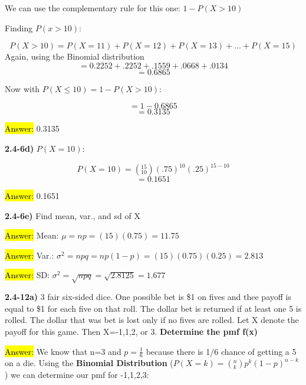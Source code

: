 \documentclass{article}
\begin{document}
We can use the complementary rule for this one: $1-P(X > 10)$

\vspace{2mm}

Finding $P(x > 10)$:

$$P(X > 10)=P(X=11)+P(X=12)+P(X=13)+...+P(X=15)$$
Again, using the Binomial distribution
$$=0.2252+.2252+.1559+.0668+.0134$$
$$=0.6865$$

Now with $P(X \le 10)=1-P(X > 10)$:

$$=1-0.6865$$
$$=0.3135$$

\vspace{2mm}

\hl{Answer:} 0.3135


\newpage
\textbf{2.4-6d)} $P(X=10)$:

$$P(X=10)=(^{15}_{10})(.75)^{10}(.25)^{15-10}$$
$$=0.1651$$

\vspace{2mm}

\hl{Answer:} 0.1651


\vspace{3mm}
\textbf{2.4-6e)} Find mean, var., and sd of X

\vspace{2mm}

\hl{Answer:} Mean: $\mu=np=(15)(0.75)=11.75$

\vspace{2mm}

\hl{Answer:} Var.: $\sigma^{2}=npq=np(1-p)=(15)(0.75)(0.25)=2.813$

\vspace{2mm}

\hl{Answer:} SD: $\sigma^{2}=\sqrt{npq}=\sqrt{2.8125}=1.677$



\newpage
\textbf{2.4-12a)} 3 fair six-sided dice. One possible bet is \$1 on fives and thee payoff is equal to \$1 for each five on that roll. The dollar bet is returned if at least one 5 is rolled. The dollar that was bet is lost only if no fives are rolled. Let X denote the payoff for this game. Then X=-1,1,2, or 3. \textbf{Determine the pmf f(x)}

\vspace{2mm}

\hl{Answer:}  We know that n=3 and $p=\frac{1}{6}$ because there is 1/6 chance of getting a 5 on a die. Using the \textbf{Binomial Distribution} ($P(X=k)=(^{n}_{k})p^{k}(1-p)^{n-k}$) we can determine our pmf for -1,1,2,3:
\end{document}
